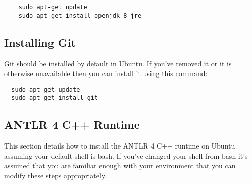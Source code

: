 \documentclass{article}
\begin{document}
\begin{lstlisting}
	sudo apt-get update
	sudo apt-get install openjdk-8-jre
\end{lstlisting}

\subsection{Installing Git}
Git should be installed by default in Ubuntu. If you've removed it or it is otherwise unavailable
then you can install it using this command:
\begin{lstlisting}
  sudo apt-get update
  sudo apt-get install git
\end{lstlisting}

\subsection{ANTLR 4 C++ Runtime}
This section details how to install the ANTLR 4 C++ runtime on Ubuntu assuming your default shell
is bash. If you've changed your shell from bash it's assumed that you are familiar enough with your
environment that you can modify these steps appropriately.
\end{document}
